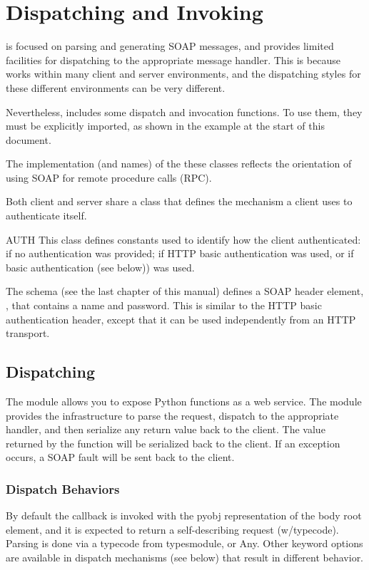 \chapter{Dispatching and Invoking}


\ZSI{} is focused on parsing and generating SOAP messages, and provides
limited facilities for dispatching to the appropriate message handler.
This is because \ZSI{} works within many client and server environments,
and the dispatching styles for these different environments can be
very different.

Nevertheless, \ZSI{} includes some dispatch and invocation functions.
To use them, they must be explicitly imported, as shown in the example
at the start of this document.

The implementation (and names) of the these classes reflects the orientation
of using SOAP for remote procedure calls (RPC).

Both client and server share a class that defines the mechanism a
client uses to authenticate itself.

\begin{classdesc}{AUTH}{}
This class defines constants used to identify how the client
authenticated:  if no authentication was provided;
 if HTTP basic authentication was used, or
 if \ZSI{} basic authentication (see below)) was used.
\end{classdesc}

The \ZSI{} schema (see the last chapter of this manual)
defines a SOAP header element, , that
contains a name and password.
This is similar to the HTTP basic authentication header, except
that it can be used independently from an HTTP transport.

\section{Dispatching}

The  module allows you to expose Python functions as a web
service.  The module provides the infrastructure to parse the request, dispatch
to the appropriate handler, and then serialize any return value back to the
client.  The value returned by the function will be serialized back to the
client.  If an exception occurs, a SOAP fault will be sent back to the client.

\subsection{Dispatch Behaviors} By default the callback is invoked with the
pyobj representation of the body root element, and it is expected to return a
self-describing request (w/typecode).  Parsing is done via a typecode from
typesmodule, or Any.  Other keyword options are available in dispatch mechanisms
(see below) that result in different behavior.

